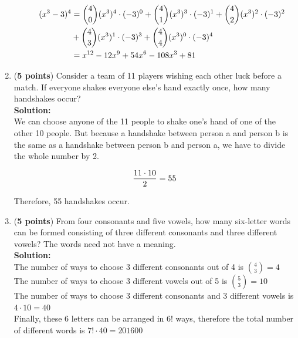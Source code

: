 \documentclass[a4paper]{article}
\begin{document}
\begin{enumerate}
\begin{enumerate}
\begin{align}
(x^3-3)^4 &= {4 \choose 0}(x^3)^4 \cdot (-3)^0 + {4 \choose 1}(x^3)^3 \cdot (-3)^1 + {4 \choose 2}(x^3)^2 \cdot (-3)^2\notag\\ &+ {4 \choose 3}(x^3)^1 \cdot (-3)^3 + {4 \choose 4}(x^3)^0 \cdot (-3)^4\notag\\
&= x^{12} - 12x^9 + 54x^6 - 108x^3 + 81\notag
\end{align}	
	
\end{enumerate}


\item (\textbf{5 points}) Consider a team of 11 players wishing each other luck before a match. If everyone shakes everyone else's hand exactly once, how many handshakes occur?\\
\textbf{Solution:}\\

We can choose anyone of the 11 people to shake one's hand of one of the other 10 people. But because a handshake between person a and person b is the same as a handshake between person b and person a, we have to divide the whole number by 2.

\begin{align}
	\frac{11 \cdot 10}{2} = 55\notag
\end{align}

Therefore, 55 handshakes occur.\\


\item (\textbf{5 points}) From four consonants and five vowels, how many six-letter words can be formed consisting of three different consonants and three different vowels? The words need not have a meaning.\\
\textbf{Solution:}\\

The number of ways to choose 3 different consonants out of 4 is ${4 \choose 3} = 4$\\

The number of ways to choose 3 different vowels out of 5 is ${5 \choose 3} = 10$\\

The number of ways to choose 3 different consonants and 3 different vowels is $4 \cdot 10 = 40$\\

Finally, these 6 letters can be arranged in $6!$ ways, therefore the total number of different words is $7! \cdot 40 = 201600$\\





\end{enumerate}
\end{document}
